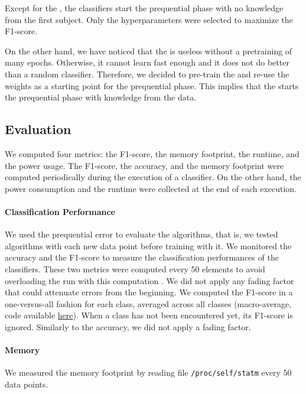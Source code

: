 Except for the \FNN, the
classifiers start the prequential phase with no
knowledge from the first subject. Only the
hyperparameters were selected to maximize the
F1-score.

On the other hand, we have noticed that the
\FNN is useless without a
pretraining of many epochs. Otherwise, it cannot
learn fast enough and it does not do better than a
random classifier. Therefore, we decided to
pre-train the \FNN and re-use
the weights as a starting point for the
prequential phase. This implies that the
\FNN starts the prequential
phase with knowledge from the data.

\subsection{Evaluation}
We computed four metrics: the F1-score, the memory
footprint, the runtime, and the power usage.
The F1-score, the accuracy, and the memory
footprint were computed periodically during the
execution of a classifier. On the other hand, the
power consumption and the runtime were collected
at the end of each execution.

\paragraph{Classification Performance}
We used the prequential error to evaluate the
algorithms, that is, we tested algorithms with
each new data point before training with it.  We
monitored the accuracy and the F1-score to measure
the classification performances of the
classifiers. These two metrics were computed every
50
elements to avoid overloading the run with this computation . We
did not apply any fading factor that could attenuate errors from the
beginning.
We computed the
F1-score in a one-versus-all fashion for each class, averaged across all classes
(macro-average, code available \href{https://github.com/azazel7/paper-benchmark/blob/9adb1039c5a65a00a66d554f0e870d14d3fff7cb/main.cpp\#L82}{here}).  When a class has not been encountered yet, its F1-score is ignored.
Similarly to the accuracy, we did not apply a fading factor.

\paragraph{Memory}
We measured the memory footprint by reading file
\texttt{/proc/self/statm} every 50 data points.

